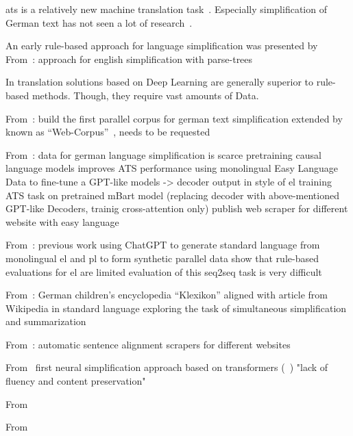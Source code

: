 \gls{ats} is a relatively new machine translation task~\autocite{schomacker2023data}.
Especially simplification of German text has not seen a lot of research~\autocite{Ansch_tz_2023}.

An early rule-based approach for language simplification was presented by~\autocite{suter2016}
From~\autocite{Garain2019}: approach for english simplification with parse-trees

In translation solutions based on Deep Learning are generally superior to rule-based methods.
Though, they require vast amounts of Data.~\autocite{otter2019survey}


From~\autocite{klaper-etal-2013-building}:
build the first parallel corpus for german text simplification
extended by ~\autocite{battisti-etal-2020-corpus}
known as \enquote{Web-Corpus}~\autocite{ebeling2022}, needs to be requested


From~\autocite{Ansch_tz_2023}:
data for german language simplification is scarce
pretraining causal language models improves ATS performance
using monolingual Easy Language Data to fine-tune a GPT-like models
-> decoder output in style of \gls{el}
training ATS task on pretrained mBart model (replacing decoder with above-mentioned GPT-like Decoders, trainig cross-attention only)
publish web scraper for different website with easy language

From~\autocite{klöser2024german}:
previous work
using ChatGPT to generate standard language from monolingual \gls{el} and \gls{pl} to form synthetic parallel data
show that rule-based evaluations for \gls{el} are limited
evaluation of this seq2seq task is very difficult

From~\autocite{aumiller2022klexikon}:
German children’s encyclopedia \enquote{Klexikon} aligned with article from Wikipedia in standard language
exploring the task of simultaneous simplification and summarization


From~\autocite{toborek2023new}:
automatic sentence alignment
scrapers for different websites

From~\autocite{sauberli-etal-2020-benchmarking}
first neural simplification approach based on transformers (~\autocite{Ansch_tz_2023})
"lack of fluency and content preservation"

From~\autocite{battisti-etal-2020-corpus}

From~\autocite{madina2023easytoread}

